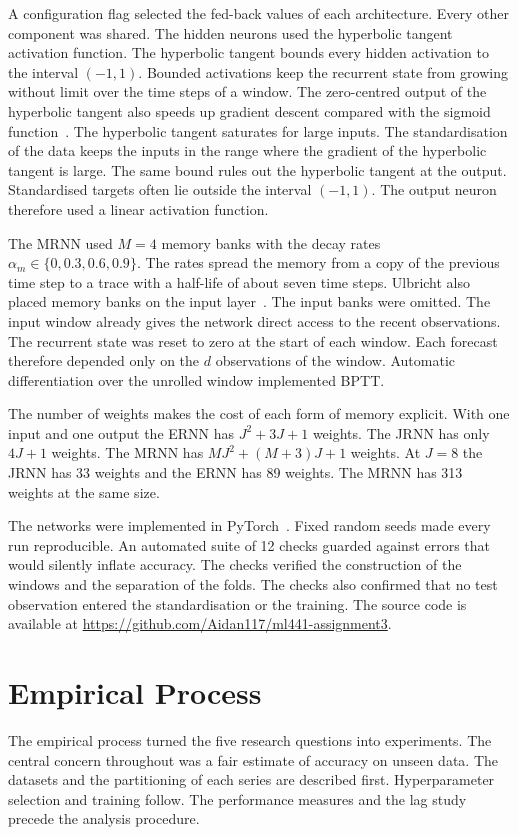 \documentclass[conference,10pt]{IEEEtran}
\begin{document}
A configuration flag selected the fed-back values of each architecture.
Every other component was shared.
The hidden neurons used the hyperbolic tangent activation function.
The hyperbolic tangent bounds every hidden activation to the interval
$(-1, 1)$.
Bounded activations keep the recurrent state from growing without limit
over the time steps of a window.
The zero-centred output of the hyperbolic tangent also speeds up
gradient descent compared with the sigmoid function~\cite{lecun1998}.
The hyperbolic tangent saturates for large inputs.
The standardisation of the data keeps the inputs in the range where the
gradient of the hyperbolic tangent is large.
The same bound rules out the hyperbolic tangent at the output.
Standardised targets often lie outside the interval $(-1, 1)$.
The output neuron therefore used a linear activation function.

The MRNN used $M = 4$ memory banks with the decay rates
$\alpha_m \in \{0, 0.3, 0.6, 0.9\}$.
The rates spread the memory from a copy of the previous time step to a
trace with a half-life of about seven time steps.
Ulbricht also placed memory banks on the input
layer~\cite{ulbricht1994}.
The input banks were omitted.
The input window already gives the network direct access to the recent
observations.
The recurrent state was reset to zero at the start of each window.
Each forecast therefore depended only on the $d$ observations of the
window.
Automatic differentiation over the unrolled window implemented BPTT.

The number of weights makes the cost of each form of memory explicit.
With one input and one output the ERNN has $J^2 + 3J + 1$ weights.
The JRNN has only $4J + 1$ weights.
The MRNN has $MJ^2 + (M+3)J + 1$ weights.
At $J = 8$ the JRNN has 33 weights and the ERNN has 89 weights.
The MRNN has 313 weights at the same size.

The networks were implemented in PyTorch~\cite{paszke2019}.
Fixed random seeds made every run reproducible.
An automated suite of 12 checks guarded against errors that would
silently inflate accuracy.
The checks verified the construction of the windows and the separation
of the folds.
The checks also confirmed that no test observation entered the
standardisation or the training.
The source code is available at
\url{https://github.com/Aidan117/ml441-assignment3}.

\section{Empirical Process}
\label{sec:empirical}
The empirical process turned the five research questions into
experiments.
The central concern throughout was a fair estimate of accuracy on unseen
data.
The datasets and the partitioning of each series are described first.
Hyperparameter selection and training follow.
The performance measures and the lag study precede the analysis
procedure.
\end{document}

